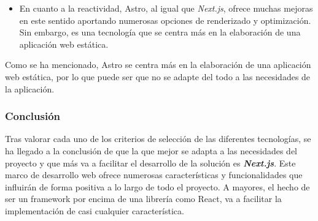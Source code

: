 \begin{itemize}
  \item[\regular] En cuanto a la reactividad, Astro, al igual que \textit{Next.js}, ofrece muchas mejoras en este sentido aportando numerosas opciones de renderizado y optimización. Sin embargo, es una tecnología que se centra más en la elaboración de una aplicación web estática. 
\end{itemize}

Como se ha mencionado, Astro se centra más en la elaboración de una aplicación web estática, por lo que puede ser que no se adapte del todo a las necesidades de la aplicación.

\subsubsection{Conclusión}

Tras valorar cada uno de los criterios de selección de las diferentes tecnologías, se ha llegado a la conclusión de que la que mejor se adapta a las necesidades del proyecto y que más va a facilitar el desarrollo de la solución es \textbf{\textit{Next.js}}. Este marco de desarrollo web ofrece numerosas características y funcionalidades que influirán de forma positiva a lo largo de todo el proyecto. A mayores, el hecho de ser un framework por encima de una librería como React, va a facilitar la implementación de casi cualquier característica.